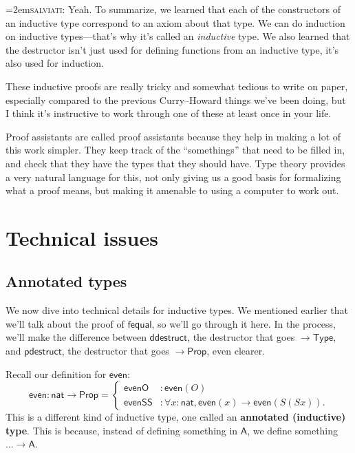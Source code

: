 \documentclass[11pt,paper=letter]{scrartcl}
\newcommand{\sf}{\mathsf}
\newcommand{\salv}{\vspace{0.5em}\noindent\hangindent=2em\textsc{salviati:} }
\newcommand{\prop}{\mathsf{Prop}}
\newcommand{\type}{\mathsf{Type}}
\begin{document}
\salv Yeah. To summarize, we learned that each of the constructors of an inductive type correspond to an axiom about that type. We can do induction on inductive types---that's why it's called an \emph{inductive} type. We also learned that the destructor isn't just used for defining functions from an inductive type, it's also used for induction.

\vspace{0.5em}

These inductive proofs are really tricky and somewhat tedious to write on paper, especially compared to the previous Curry--Howard things we've been doing, but I think it's instructive to work through one of these at least once in your life.

Proof assistants are called proof assistants because they help in making a lot of this work simpler. They keep track of the ``somethings'' that need to be filled in, and check that they have the types that they should have. Type theory provides a very natural language for this, not only giving us a good basis for formalizing what a proof means, but making it amenable to using a computer to work out.

\clearpage

\section{Technical issues}

\subsection{Annotated types}

We now dive into technical details for inductive types. We mentioned earlier that we'll talk about the proof of $\sf{fequal}$, so we'll go through it here. In the process, we'll make the difference between $\sf{ddestruct}$, the destructor that goes $\to \type$, and $\sf{pdestruct}$, the destructor that goes $\to \prop$, even clearer.

Recall our definition for $\sf{even}$: \[
  \sf{even} : \sf{nat} \to \prop = \begin{cases}
    \sf{evenO} &: \sf{even}(O) \\
    \sf{evenSS} &: \forall x: \sf{nat}, \sf{even}(x) \to \sf{even}(S(Sx)).
  \end{cases}
\]
This is a different kind of inductive type, one called an \textbf{annotated (inductive) type}. This is because, instead of defining something in $\sf{A}$, we define something $\dots \to \sf{A}$.
\end{document}
